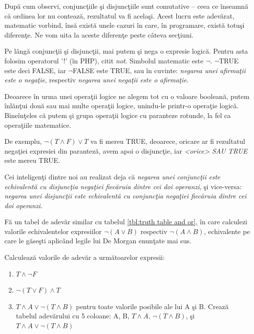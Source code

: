 După cum observi, conjuncţiile şi disjuncţiile sunt comutative -- ceea ce înseamnă
că ordinea lor nu contează, rezultatul va fi acelaşi. Acest lucru este adevărat,
matematic vorbind, însă există unele cazuri în care, în programare, există totuşi
diferenţe. Ne vom uita la aceste diferenţe peste câteva secţiuni.

Pe lângă conjuncţii şi disjuncţii, mai putem şi nega o expresie logică. Pentru
asta folosim operatorul '!' (în PHP), citit \textit{not}. Simbolul matematic
este $\lnot$. $\lnot$TRUE este deci FALSE, iar $\lnot$FALSE este TRUE, sau în cuvinte:
\textit{negarea unei afirmaţii este o negaţie}, respectiv \textit{negarea unei negaţii este o afirmaţie}.

Deoarece în urma unei operaţii logice ne alegem tot cu o valoare booleană,
putem înlănţui două sau mai multe operaţii logice, unindu-le printr-o operaţie logică.
Bineînţeles că putem şi grupa operaţii logice cu paranteze rotunde, la fel
ca operaţiile matematice.

De exemplu, 
$\lnot(T \land F) \lor T$ va fi mereu TRUE, deoarece, oricare ar fi rezultatul negaţiei
expresiei din paranteză,
avem apoi o disjuncţie, iar \textit{<orice> SAU TRUE} este mereu TRUE.


\begin{Exercise}[title={Legile lui De Morgan},difficulty=2]
Cei inteligenţi dintre noi au realizat deja că \textit{negarea unei conjuncţii este echivalentă
cu disjuncţia negaţiei fiecăruia dintre cei doi operanzi}, şi vice-versa: \textit{negarea unei disjuncţii
este echivalentă cu conjuncţia negaţiei fiecăruia dintre cei doi operanzi}.

Fă un tabel de adevăr similar cu tabelul \ref{tbl:truth table and or}, în care calculezi
valorile echivalentelor expresiilor $\lnot(A \lor B)$ respectiv $\lnot(A \land B)$,
echivalente pe care le găseşti aplicând legile lui De Morgan enunţate mai sus.
\end{Exercise}

\begin{Exercise}[title={Operaţii logice},difficulty=1]
Calculează valorile de adevăr a următoarelor expresii:
\begin{enumerate}
  \item $T \land {\lnot}F $
  \item $\lnot(T \lor F) \land T $
  \item $T \land A \lor \lnot(T \land B)$ pentru toate valorile posibile ale lui A şi B. Crează tabelul adevărului cu 5 coloane: A, B, $T \land A$, $\lnot(T \land B)$, şi $T \land A \lor \lnot(T \land B)$
\end{enumerate}
\end{Exercise}

